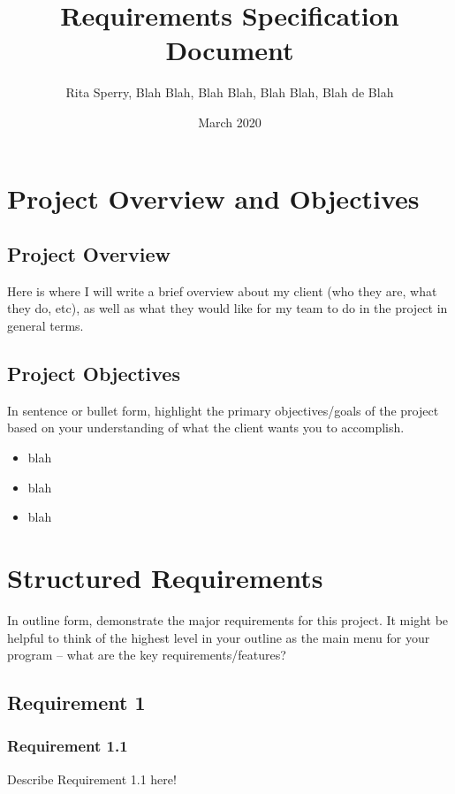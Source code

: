 \documentclass{article}
\title{Requirements Specification Document}
\author{Rita Sperry, Blah Blah, Blah Blah, Blah Blah, Blah de Blah}
\date{March 2020}
\begin{document}
\setlength{\parindent}{0pt}

\begin{titlingpage}
\maketitle
\end{titlingpage}

\section{Project Overview and Objectives}
\subsection{Project Overview}
Here is where I will write a brief overview about my client (who they are, what they do, etc), as well as what they would like for my team to do in the project in general terms.


\subsection{Project Objectives}

In sentence or bullet form, highlight the primary objectives/goals of the project based on your understanding of what the client wants you to accomplish.
\begin{itemize}
 \item blah
 \item blah
 \item blah
\end{itemize}


\section{Structured Requirements}

In outline form, demonstrate the major requirements for this project. It might be helpful to think of the highest level in your outline as the main menu for your program -- what are the key requirements/features?

\subsection{Requirement 1}
\subsubsection{Requirement 1.1}
Describe Requirement 1.1 here!
\end{document}
